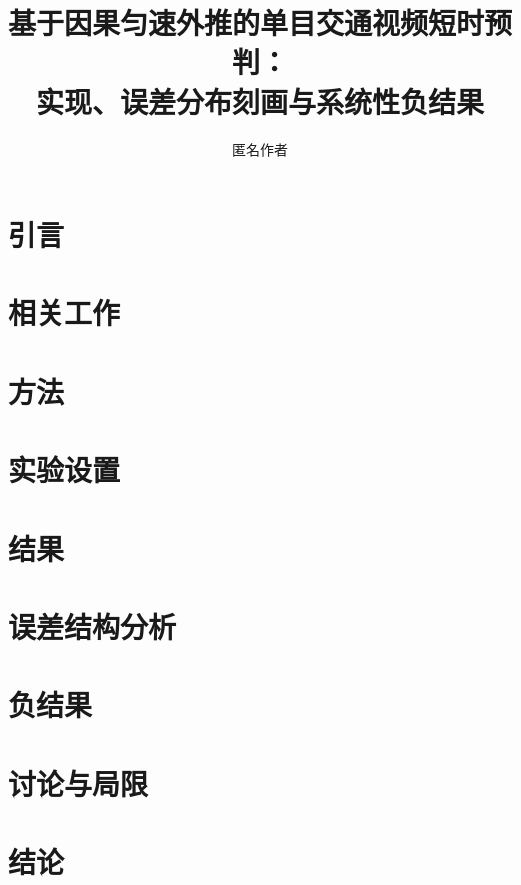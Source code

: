\documentclass[11pt,a4paper]{ctexart}
\title{基于因果匀速外推的单目交通视频短时预判：\\实现、误差分布刻画与系统性负结果}
\author{匿名作者}
\date{}
\begin{document}
\maketitle

\begin{abstract}
\end{abstract}

\section{引言}
\label{sec:intro}

\section{相关工作}
\label{sec:related}

\section{方法}\label{sec:method}

\subsection{}

\subsection{}

\subsection{}

\section{实验设置}
\label{sec:setup}

\section{结果}
\label{sec:results}

\section{误差结构分析}
\label{sec:analysis}

\section{负结果}
\label{sec:negative}

\section{讨论与局限}
\label{sec:discussion}

\section{结论}
\label{sec:conclusion}

\clearpage


\end{document}
